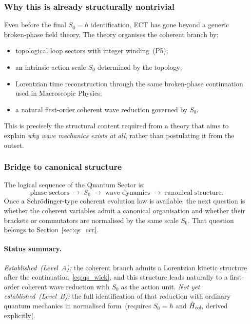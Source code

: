 \subsubsection*{Why this is already structurally nontrivial}

Even before the final $S_0=\hbar$ identification, ECT has gone beyond a
generic broken-phase field theory.
The theory organises the coherent branch by:
\begin{itemize}
  \item topological loop sectors with integer winding~(P5);
  \item an intrinsic action scale $S_0$ determined by the topology;
  \item Lorentzian time reconstruction through the same broken-phase
    continuation used in Macroscopic Physics;
  \item a natural first-order coherent wave reduction governed by $S_0$.
\end{itemize}
This is precisely the structural content required from a theory that
aims to explain \emph{why wave mechanics exists at all}, rather than
postulating it from the outset.

\subsubsection*{Bridge to canonical structure}

The logical sequence of the Quantum Sector is:
\begin{equation}
  \label{eq:qs_logic_chain}
  \text{phase sectors}
  \;\longrightarrow\;
  S_0
  \;\longrightarrow\;
  \text{wave dynamics}
  \;\longrightarrow\;
  \text{canonical structure}.
\end{equation}
Once a Schr\"odinger-type coherent evolution law is available, the next
question is whether the coherent variables admit a canonical
organisation and whether their brackets or commutators are normalised
by the same scale $S_0$.
That question belongs to Section~\ref{sec:qs_ccr}.

\paragraph{Status summary.}
\textit{Established~(Level~A):}
the coherent branch admits a Lorentzian kinetic structure after the
continuation~\eqref{eq:qs_wick}, and this structure leads naturally
to a first-order coherent wave reduction with $S_0$ as the action unit.
\textit{Not yet established~(Level~B):}
the full identification of that reduction with ordinary quantum
mechanics in normalised form~(requires $S_0=\hbar$ and
$\hat{H}_{\rm coh}$ derived explicitly).

